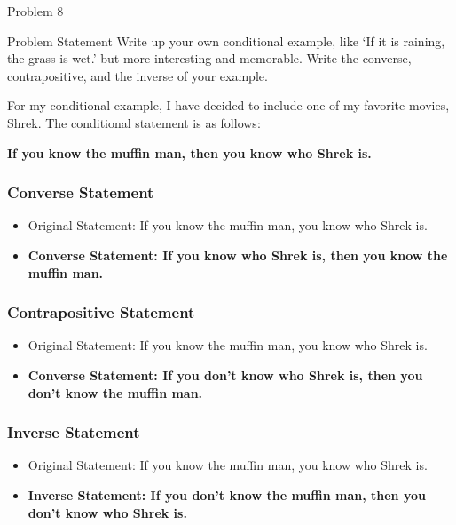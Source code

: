 \begin{problem}{Problem 8}
    \begin{statement}{Problem Statement}
        Write up your own conditional example, like `If it is raining, the grass is wet.' but more interesting and memorable. Write the converse, contrapositive, and the inverse of your example.
    \end{statement}

    \begin{Highlight}[Solution]
        For my conditional example, I have decided to include one of my favorite movies, Shrek. The conditional statement is as follows:

        \begin{center}
            \textbf{If you know the muffin man, then you know who Shrek is.}
        \end{center}

        \subsubsection*{Converse Statement}

        \begin{itemize}
            \item Original Statement: If you know the muffin man, you know who Shrek is.
            \item \textbf{Converse Statement: If you know who Shrek is, then you know the muffin man.}
        \end{itemize}

        \subsubsection*{Contrapositive Statement}

        \begin{itemize}
            \item Original Statement: If you know the muffin man, you know who Shrek is.
            \item \textbf{Converse Statement: If you don't know who Shrek is, then you don't know the muffin man.}
        \end{itemize}

        \subsubsection*{Inverse Statement}

        \begin{itemize}
            \item Original Statement: If you know the muffin man, you know who Shrek is.
            \item \textbf{Inverse Statement: If you don't know the muffin man, then you don't know who Shrek is.}
        \end{itemize}
    \end{Highlight}
\end{problem}

